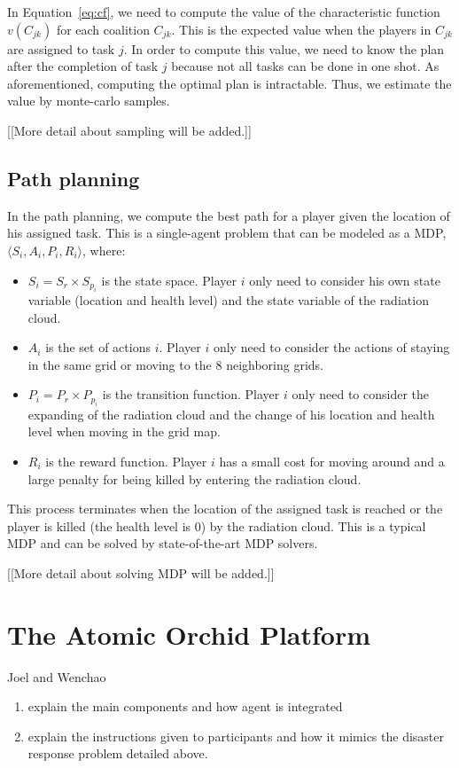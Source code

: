 \documentclass{aamas2014}
\begin{document}
In Equation~\ref{eq:cf}, we need to compute the value of the
characteristic function $v(C_{jk})$ for each coalition $C_{jk}$.
This is the expected value when the players in $C_{jk}$ are
assigned to task $j$. In order to compute this value, we need to
know the plan after the completion of task $j$ because not all
tasks can be done in one shot. As aforementioned, computing the
optimal plan is intractable. Thus, we estimate the value by
monte-carlo samples.

[[More detail about sampling will be added.]]

\subsection{Path planning}

In the path planning, we compute the best path for a player given
the location of his assigned task. This is a single-agent problem
that can be modeled as a MDP, $\langle S_i, A_i, P_i, R_i \rangle$,
where:
\begin{itemize}
  \item $S_i = S_r \times S_{p_i}$ is the state space. Player
      $i$ only need to consider his own state variable
      (location and health level) and the state variable of the
      radiation cloud.
  \item $A_i$ is the set of actions $i$. Player $i$ only need
      to consider the actions of staying in the same grid or
      moving to the 8 neighboring grids.
  \item $P_i = P_r \times P_{p_i}$ is the transition function.
      Player $i$ only need to consider the expanding of the
      radiation cloud and the change of his location and health
      level when moving in the grid map.
  \item $R_i$ is the reward function. Player $i$ has a small
      cost for moving around and a large penalty for being
      killed by entering the radiation cloud.
\end{itemize}
This process terminates when the location of the assigned task is
reached or the player is killed (the health level is 0) by the
radiation cloud. This is a typical MDP and can be solved by
state-of-the-art MDP solvers.

[[More detail about solving MDP will be added.]]

\section{The Atomic Orchid Platform}
Joel and Wenchao
\begin{enumerate}
\item explain the main components  and how agent is integrated
\item explain the instructions given to participants and how it mimics the disaster response problem detailed above.
\end{enumerate}
\end{document}
